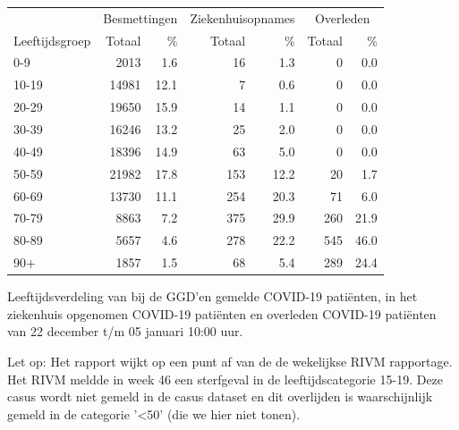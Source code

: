 \documentclass[
  english,
  man,floatsintext]{apa6}
\begin{document}
\begin{table}[H]
\centering\begingroup\fontsize{11}{13}\selectfont

\begin{threeparttable}
\begin{tabular}{lrrrrrr}
\toprule
\multicolumn{1}{c}{ } & \multicolumn{2}{c}{Besmettingen} & \multicolumn{2}{c}{Ziekenhuisopnames} & \multicolumn{2}{c}{Overleden} \\
\cmidrule(l{3pt}r{3pt}){2-3} \cmidrule(l{3pt}r{3pt}){4-5} \cmidrule(l{3pt}r{3pt}){6-7}
Leeftijdsgroep & Totaal & \% & Totaal & \% & Totaal & \%\\
\midrule
0-9 & 2013 & 1.6 & 16 & 1.3 & 0 & 0.0\\
10-19 & 14981 & 12.1 & 7 & 0.6 & 0 & 0.0\\
20-29 & 19650 & 15.9 & 14 & 1.1 & 0 & 0.0\\
30-39 & 16246 & 13.2 & 25 & 2.0 & 0 & 0.0\\
40-49 & 18396 & 14.9 & 63 & 5.0 & 0 & 0.0\\
50-59 & 21982 & 17.8 & 153 & 12.2 & 20 & 1.7\\
60-69 & 13730 & 11.1 & 254 & 20.3 & 71 & 6.0\\
70-79 & 8863 & 7.2 & 375 & 29.9 & 260 & 21.9\\
80-89 & 5657 & 4.6 & 278 & 22.2 & 545 & 46.0\\
90+ & 1857 & 1.5 & 68 & 5.4 & 289 & 24.4\\
\bottomrule
\end{tabular}
\begin{tablenotes}
\item[1] Leeftijdsverdeling van bij de GGD’en gemelde COVID-19 patiënten, in het ziekenhuis opgenomen COVID-19 patiënten en overleden COVID-19 patiënten van 22 december t/m 05 januari 10:00 uur.
\item[2] Let op: Het rapport wijkt op een punt af van de de wekelijkse RIVM rapportage. Het RIVM meldde in week 46 een sterfgeval in de leeftijdscategorie 15-19. Deze casus wordt niet gemeld in de casus dataset en dit overlijden is waarschijnlijk gemeld in de categorie '<50' (die we hier niet tonen).
\end{tablenotes}
\end{threeparttable}
\endgroup{}
\end{table}

\newpage
\end{document}

